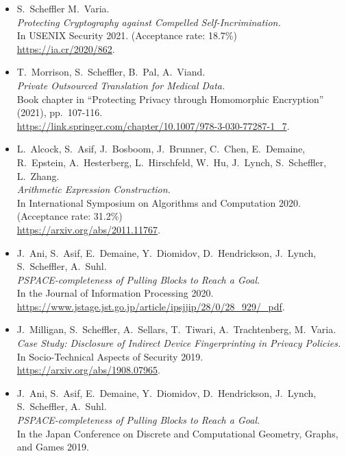 \documentclass{res}
\begin{document}
\begin{resume}
\begin{itemize}
\item[\foregoneconclusion] S.~Scheffler M.~Varia. \\
\emph{Protecting Cryptography against Compelled Self-Incrimination.} \\
In USENIX Security 2021. (Acceptance rate: 18.7\%)\\
\url{https://ia.cr/2020/862}.

\item[\privateTranslation] T.~Morrison, S.~Scheffler, B.~Pal, A.~Viand. \\
\emph{Private Outsourced Translation for Medical Data.} \\
Book chapter in ``Protecting Privacy through Homomorphic Encryption'' (2021), pp.~107-116. \\
\url{https://link.springer.com/chapter/10.1007/978-3-030-77287-1_7}.

\item[\AEC] L.~Alcock, S.~Asif, J.~Bosboom, J.~Brunner, C.~Chen, E.~Demaine, R.~Epstein,
A.~Hesterberg, L.~Hirschfeld, W.~Hu, J.~Lynch, S.~Scheffler, L.~Zhang. \\
\emph{Arithmetic Expression Construction.} \\
In International Symposium on Algorithms and Computation 2020. (Acceptance rate: 31.2\%) \\
\url{https://arxiv.org/abs/2011.11767}.

\item[\pullingblocksJIP] J.~Ani, S.~Asif, E.~Demaine, Y.~Diomidov, D.~Hendrickson, J.~Lynch, S.~Scheffler, A.~Suhl. \\
\emph{PSPACE-completeness of Pulling Blocks to Reach a Goal.} \\
In the Journal of Information Processing 2020.\\
\url{https://www.jstage.jst.go.jp/article/ipsjjip/28/0/28_929/_pdf}.

\item[\devicefingerprinting] J.~Milligan, S.~Scheffler, A.~Sellars, T.~Tiwari, A.~Trachtenberg, M.~Varia.  \\
\emph{Case Study: Disclosure of Indirect Device Fingerprinting in Privacy Policies.} \\
In Socio-Technical Aspects of Security 2019. \\
\url{https://arxiv.org/abs/1908.07965}.

\item[\pullingblocks] J.~Ani, S.~Asif, E.~Demaine, Y.~Diomidov, D.~Hendrickson, J.~Lynch, S.~Scheffler, A.~Suhl. \\
\emph{PSPACE-completeness of Pulling Blocks to Reach a Goal.}  \\
In the Japan Conference on Discrete and Computational Geometry, Graphs, and Games 2019.


\end{itemize}
\end{resume}
\end{document}

